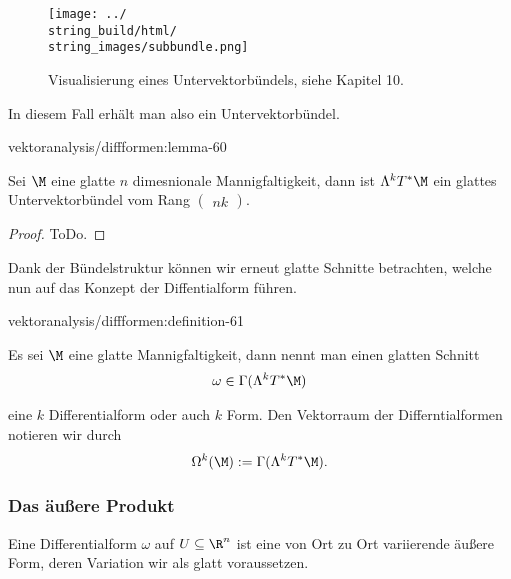 \documentclass[letterpaper,10pt,english]{jupyterBook}
\begin{document}
\begin{figure}[htbp]
\centering


\noindent\texttt{[image: ../\\string\_build/html/\\string\_images/subbundle.png]}
\caption{Visualisierung eines Untervektorbündels, siehe \cite{Lee03} Kapitel 10.}\label{\detokenize{vektoranalysis/diffformen:fig-subbundle}}\end{figure}

\par
In diesem Fall erhält man also ein Untervektorbündel.
\begin{lemma}{}{vektoranalysis/diffformen:lemma-60}



\par
Sei \(\M\) eine glatte \(n\) dimesnionale Mannigfaltigkeit, dann ist \(\Lambda^k T^\ast\M\) ein glattes Untervektorbündel vom Rang \(\begin{pmatrix} n k \end{pmatrix}\).
\end{lemma}

\begin{proof}
 ToDo.
\end{proof}

\par
Dank der Bündelstruktur können wir erneut glatte Schnitte betrachten, welche nun auf das Konzept der Diffentialform führen.
\begin{definition}{}{vektoranalysis/diffformen:definition-61}



\par
Es sei \(\M\) eine glatte Mannigfaltigkeit, dann nennt man einen glatten Schnitt
\begin{align*}
\omega\in \Gamma(\Lambda^k T^\ast\M)
\end{align*}
\par
eine \(k\) Differentialform oder auch \(k\) Form. Den Vektorraum der Differntialformen notieren wir durch
\begin{align*}
\Omega^k(\M) := \Gamma(\Lambda^k T^\ast\M).
\end{align*}\end{definition}


\subsubsection{Das äußere Produkt}
\label{\detokenize{vektoranalysis/diffformen:das-auszere-produkt}}
\par
Eine Differentialform \(\omega\) auf \(U\subseteq\R^n\) ist eine von Ort zu Ort variierende äußere Form, deren Variation wir als glatt voraussetzen.
\end{document}
